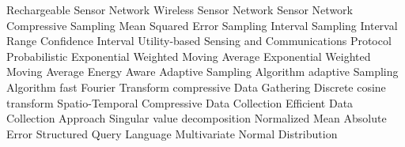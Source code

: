 \begin{acronym}[YTM]
   {Rechargeable Sensor Network}
   {Wireless Sensor Network}
    {Sensor Network}
    {Compressive Sampling}
   {Mean Squared Error}
    {Sampling Interval}
   {Sampling Interval Range}
    {Confidence Interval}
  {Utility-based Sensing and Communications Protocol}
 {Probabilistic Exponential Weighted Moving Average}
  {Exponential Weighted Moving Average}
  {Energy Aware Adaptive Sampling Algorithm}
   {adaptive Sampling Algorithm}
   {fast Fourier Transform}
   {compressive Data Gathering}
   {Discrete cosine transform}
 {Spatio-Temporal Compressive Data Collection}
  {Efficient Data Collection Approach}
   {Singular value decomposition}
  {Normalized Mean Absolute Error}
   {Structured Query Language}
   {Multivariate Normal Distribution}
\end{acronym}